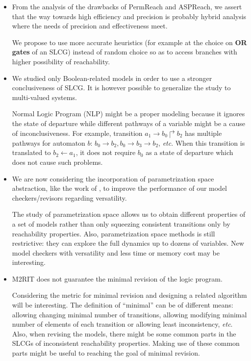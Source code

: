 \begin{itemize}
    \item From the analysis of the drawbacks of PermReach and ASPReach, we assert that the way towards high efficiency and precision is probably hybrid analysis where the needs of precision and effectiveness meet.
    
    We propose to use more accurate heuristics (for example at the choice on \textbf{OR gates} of an SLCG) instead of random choice so as to access branches with higher possibility of reachability.

    \item We studied only Boolean-related models in order to use a stronger conclusiveness of SLCG. 
    It is however possible to generalize the study to multi-valued systems.
    
    Normal Logic Program (NLP) might be a proper modeling because it ignores the state of departure while different pathways of a variable might be a cause of inconclusiveness.
    For example, transition $a_1\to b_0\Rsh b_2$ has multiple pathways for automaton $b$: $b_0\to b_2, b_0\to b_3\to b_2$, \textit{etc}.
    When this transition is translated to $b_2\gets a_1$, it does not require $b_0$ as a state of departure which does not cause such problems.
    
    \item We are now considering the incorporation of parametrization space abstraction, like the work of \cite{PRNs-TCS18}, to improve the performance of our model checkers/revisors regarding versatility.
    
    The study of parametrization space allows us to obtain different properties of a set of models rather than only squeezing consistent transitions only by reachability properties.
    Also, parametrization space methods is still restrictive: they can explore the full dynamics up to dozens of variables.
    New model checkers with versatility and less time or memory cost may be interesting.
    
    
    \item M2RIT does not guarantee the minimal revision of the logic program.
    
    Considering the metric for minimal revision and designing a related algorithm will be interesting.
    The definition of ``minimal'' can be of different means: allowing changing minimal number of transitions, allowing modifying minimal number of elements of each transition or allowing least inconsistency, \textit{etc}.
    Also, when revising the models, there might be some common parts in the SLCGs of inconsistent reachability properties.
    Making use of these common parts might be useful to reaching the goal of minimal revision.
\end{itemize}